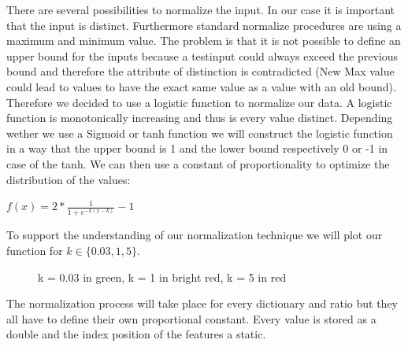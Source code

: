 \documentclass[paper=A4,pagesize=auto,12pt,headinclude=true,footinclude=true,BCOR=0mm,DIV=calc]{scrartcl}
\begin{document}
There are several possibilities to normalize the input. In our case it is important that the input is distinct. Furthermore standard normalize procedures are using a maximum and minimum value. The problem is that it is not possible to define an upper bound for the inputs because a testinput could always exceed the previous bound and therefore the attribute of distinction is contradicted (New Max value could lead to values to have the exact same value as a value with an old bound).
Therefore we decided to use a logistic function to normalize our data. A logistic function is monotonically increasing and thus is every value distinct. Depending wether we use a Sigmoid or tanh function we will construct the logistic function in a way that the upper bound is 1 and the lower bound respectively 0 or -1 in case of the tanh. 
We can then use a constant of proportionality to optimize the distribution of the values:

$f(x) = 2 * \frac{1}{1 + e^{-k(x-k)}} -1$

To support the understanding of our normalization technique we will plot our function for $k \in \{0.03, 1, 5\}$.\\
\begin{figure}[H]
	\caption{k = 0.03 in green, k = 1 in bright red, k = 5 in red}
\end{figure}

The normalization process will take place for every dictionary and ratio but they all have to define their own proportional constant.
Every value is stored as a double and the index position of the features a static.




	
\end{document}
